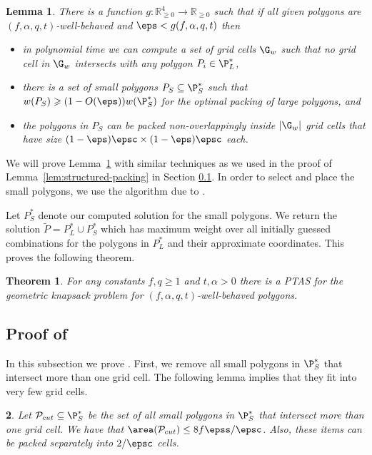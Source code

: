 \documentclass[10pt,a4paper]{article}
\newtheorem{theorem}{Theorem}[section]
\newtheorem{lemma}{Lemma}[section]
\theoremstyle{plain}
\theoremstyle{plain}
\newtheorem{lem}[theorem]{\protect\lemmaname}
\theoremstyle{plain}
\theoremstyle{definition}
\providecommand{\lemmaname}{Lemma}
\def\rem#1{{\marginpar{\raggedright\scriptsize #1}}}
\newcommand{\awr}[1]{\rem{\textcolor{orange}{$\bullet$ #1}}}
\begin{document}
{\begin{lemma}\label{lem:structured-packing-polygon}
	There is a function $g:\mathbb{R}^4_{\geqslant 0} \rightarrow \mathbb{R}_{\geqslant 0}$ such that if all given polygons are $(f,\alpha,q, t)$-well-behaved and $\eps < g(f,\alpha,q,t)$ then
	\begin{itemize}
	 \item in polynomial time we can compute a set of grid cells $\G_w$ such that no grid cell in $\G_w$ intersects with any
	polygon $P_i \in\P_{L}^{*}$,
	\item there is a set of small polygons $P_S \subseteq \P_{S}^*$ such that $w(P_{S}) \geqslant (1-O(\eps))w(\P_{S}^{*})$ for the optimal packing of large polygons, and
	\item the polygons in $P_S$ can be packed non-overlappingly inside $|\G_w|$ grid cells that have size
	\mbox{$(1-\eps) \epsc \times (1-\eps) \epsc$} each.
	\end{itemize}
\end{lemma}
We will prove Lemma~\ref{lem:structured-packing-polygon} {with similar techniques as we used in the proof of Lemma~\ref{lem:structured-packing}} in Section \ref{susec:smallpoly}.
In order to select and place the small polygons, we use the algorithm due to . 

{Let $P_S^*$ denote our computed solution for the small polygons.
We return the solution $\tilde P = P_L^* \cup P_S^*$ which has maximum weight over all initially guessed combinations for the polygons in $P_L^*$ and their approximate coordinates.}
This proves the following theorem. 


\begin{theorem} \label{thm:polygon} For any constants $f,q\ge1$ and $t,\alpha>0$ there is a
	\textsf{PTAS} for the geometric knapsack problem for \emph{$(f,\alpha,q, t)$-well-behaved} polygons.\end{theorem}




\subsection{Proof of }
\label{susec:smallpoly}
In this subsection we prove . First, we remove all small polygons in $\P_{S}^{*}$ that intersect more than one grid cell. The following lemma implies that they fit into very few grid cells.
\begin{lem}
	\label{lem: cut-polygon}
	Let $\mathcal{P}_{cut}\subseteq \P_{S}^{*}$ be the set of all small polygons in $\P_{S}^{*}$ that intersect more than one grid cell. We have that $\area(\mathcal{P}_{cut}) \le 8 f \epss/\epsc$. %
 Also, these items can be packed separately into $2/\epsc$ cells.
\end{lem}

}
\end{document}
